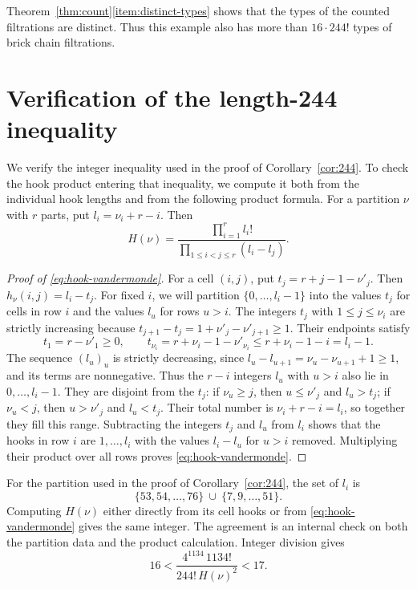 \documentclass[a4paper,reqno,10pt]{amsart}
\theoremstyle{definition}
\numberwithin{equation}{section}
\begin{document}
Theorem~\ref{thm:count}\ref{item:distinct-types} shows that the types of the counted filtrations
are distinct. Thus this example also has more than $16\cdot244!$ types
of brick chain filtrations.

\appendix
\section{Verification of the length-244 inequality}\label{sec:certificate}

We verify the integer inequality used in the proof of
Corollary~\ref{cor:244}. To check the hook product entering that
inequality, we compute it both from the individual hook lengths and
from the following product formula.
For a partition $\nu$ with $r$ parts, put
$l_i=\nu_i+r-i$. Then
\begin{equation}\label{eq:hook-vandermonde}
 H(\nu)=\frac{\prod_{i=1}^r l_i!}
               {\prod_{1\leq i<j\leq r}(l_i-l_j)}.
\end{equation}
\begin{proof}[Proof of \eqref{eq:hook-vandermonde}]
For a cell $(i,j)$, put $t_j=r+j-1-\nu'_j$. Then
$h_\nu(i,j)=l_i-t_j$. For fixed $i$, we will partition
$\{0,\ldots,l_i-1\}$ into the values $t_j$ for cells in row $i$
and the values $l_u$ for rows $u>i$.
The integers $t_j$ with
$1\leq j\leq\nu_i$ are strictly increasing because
$t_{j+1}-t_j=1+\nu'_j-\nu'_{j+1}\geq1$. Their endpoints satisfy
\[
 t_1=r-\nu'_1\geq0,\qquad
 t_{\nu_i}=r+\nu_i-1-\nu'_{\nu_i}
   \leq r+\nu_i-1-i=l_i-1.
\]
The sequence $(l_u)_u$ is strictly decreasing, since
$l_u-l_{u+1}=\nu_u-\nu_{u+1}+1\geq1$, and its terms are nonnegative.
Thus the $r-i$ integers $l_u$ with $u>i$ also lie in $0,\ldots,l_i-1$.
They are disjoint from the $t_j$: if $\nu_u\geq j$, then
$u\leq\nu'_j$ and $l_u>t_j$; if $\nu_u<j$, then
$u>\nu'_j$ and $l_u<t_j$.
Their total number is $\nu_i+r-i=l_i$, so together they fill this
range. Subtracting the integers $t_j$ and $l_u$ from $l_i$ shows that
the hooks in row $i$
are $1,\ldots,l_i$ with the values $l_i-l_u$ for $u>i$ removed.
Multiplying their product over all rows proves
\eqref{eq:hook-vandermonde}.
\end{proof}

For the partition used in the proof of Corollary~\ref{cor:244},
the set of $l_i$ is
\[
 \{53,54,\ldots,76\}\ \cup\ \{7,9,\ldots,51\}.
\]
Computing $H(\nu)$ either directly from its cell hooks or from
\eqref{eq:hook-vandermonde} gives the same integer. The agreement is an
internal check on both the partition data and the product calculation.
Integer division gives
\begin{equation}\label{eq:certificate}
 16<\frac{4^{1134}\,1134!}{244!\,H(\nu)^2}<17.
\end{equation}
\end{document}
